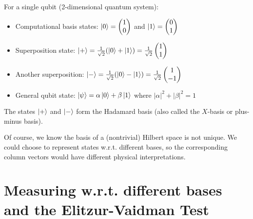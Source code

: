 \begin{example}
For a single qubit (2-dimensional quantum system):
\begin{itemize}
\item Computational basis states: $\ket{0} = \begin{pmatrix} 1 \\ 0 \end{pmatrix}$ and $\ket{1} = \begin{pmatrix} 0 \\ 1 \end{pmatrix}$

\item Superposition state: $\ket{+} = \frac{1}{\sqrt{2}}(\ket{0} + \ket{1}) = \frac{1}{\sqrt{2}}\begin{pmatrix} 1 \\ 1 \end{pmatrix}$

\item Another superposition: $\ket{-} = \frac{1}{\sqrt{2}}(\ket{0} - \ket{1}) = \frac{1}{\sqrt{2}}\begin{pmatrix} 1 \\ -1 \end{pmatrix}$

\item General qubit state: $\ket{\psi} = \alpha\ket{0} + \beta\ket{1}$ where $|\alpha|^2 + |\beta|^2 = 1$
\end{itemize}
The states $\ket{+}$ and $\ket{-}$ form the Hadamard basis (also called the $X$-basis or plus-minus basis).
\end{example}

Of course, we know the basis of a (nontrivial) Hilbert space is not unique. We could choose to represent states w.r.t. different bases, so the corresponding column vectors would have different physical interpretations.

\section{Measuring w.r.t. different bases and the Elitzur-Vaidman Test}
